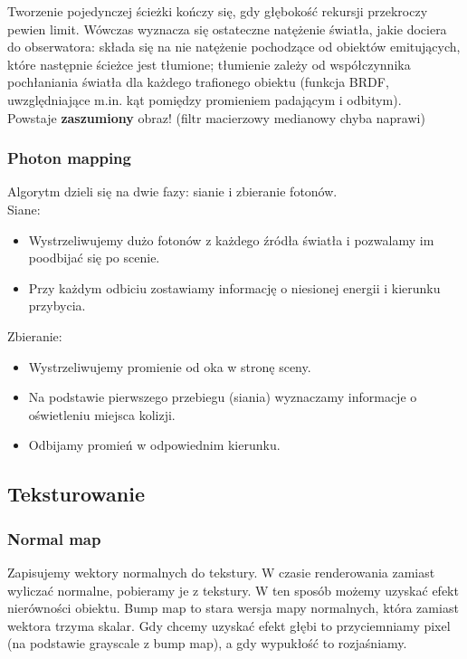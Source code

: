 \documentclass[12pt]{article}
\begin{document}
Tworzenie pojedynczej ścieżki kończy się, gdy głębokość rekursji przekroczy pewien limit. Wówczas wyznacza się ostateczne natężenie światła, jakie dociera do obserwatora: składa się na nie natężenie pochodzące od obiektów emitujących, które następnie ścieżce jest tłumione; tłumienie zależy od współczynnika pochłaniania światła dla każdego trafionego obiektu (funkcja BRDF, uwzględniające m.in. kąt pomiędzy promieniem padającym i odbitym).\\
Powstaje \textbf{zaszumiony} obraz! (filtr macierzowy medianowy chyba naprawi)

\subsubsection{Photon mapping}
Algorytm dzieli się na dwie fazy: sianie i zbieranie fotonów.\\
Siane:
\begin{itemize}
	\item Wystrzeliwujemy dużo fotonów z każdego źródła światła i pozwalamy im poodbijać się po scenie.
	\item Przy każdym odbiciu zostawiamy informację o niesionej energii i kierunku przybycia.
\end{itemize}
Zbieranie:
\begin{itemize}
	\item Wystrzeliwujemy promienie od oka w stronę sceny.
	\item Na podstawie pierwszego przebiegu (siania) wyznaczamy informacje o oświetleniu miejsca kolizji.
	\item Odbijamy promień w odpowiednim kierunku.
\end{itemize}

\subsection{Teksturowanie}

\subsubsection{Normal map}
Zapisujemy wektory normalnych do tekstury. W czasie renderowania zamiast wyliczać normalne, pobieramy je z tekstury. W ten sposób możemy uzyskać efekt nierówności obiektu. Bump map to stara wersja mapy normalnych, która zamiast wektora trzyma skalar. Gdy chcemy uzyskać efekt głębi to przyciemniamy pixel (na podstawie grayscale z bump map), a gdy wypukłość to rozjaśniamy. 
\end{document}
